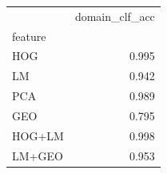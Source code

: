 \begin{tabular}{lr}
\toprule
 & domain_clf_acc \\
feature &  \\
\midrule
HOG & 0.995 \\
LM & 0.942 \\
PCA & 0.989 \\
GEO & 0.795 \\
HOG+LM & 0.998 \\
LM+GEO & 0.953 \\
\bottomrule
\end{tabular}
